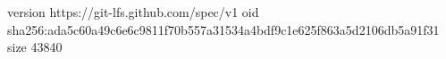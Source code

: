 version https://git-lfs.github.com/spec/v1
oid sha256:ada5c60a49c6e6c9811f70b557a31534a4bdf9c1e625f863a5d2106db5a91f31
size 43840
